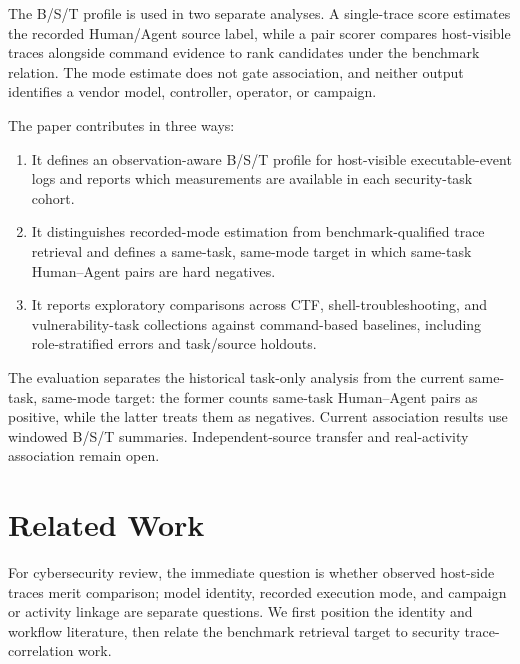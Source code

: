 \documentclass[10pt]{article}
\begin{document}
The B/S/T profile is used in two separate analyses. A single-trace score estimates the recorded Human/Agent source label, while a pair scorer compares host-visible traces alongside command evidence to rank candidates under the benchmark relation. The mode estimate does not gate association, and neither output identifies a vendor model, controller, operator, or campaign.

The paper contributes in three ways:
\begin{enumerate}
\item It defines an observation-aware B/S/T profile for host-visible executable-event logs and reports which measurements are available in each security-task cohort.
\item It distinguishes recorded-mode estimation from benchmark-qualified trace retrieval and defines a same-task, same-mode target in which same-task Human--Agent pairs are hard negatives.
\item It reports exploratory comparisons across CTF, shell-troubleshooting, and vulnerability-task collections against command-based baselines, including role-stratified errors and task/source holdouts.
\end{enumerate}
The evaluation separates the historical task-only analysis from the current same-task, same-mode target: the former counts same-task Human--Agent pairs as positive, while the latter treats them as negatives. Current association results use windowed B/S/T summaries. Independent-source transfer and real-activity association remain open.

\FloatBarrier

\section{Related Work}
\label{sec:related-work}
For cybersecurity review, the immediate question is whether observed host-side traces merit comparison; model identity, recorded execution mode, and campaign or activity linkage are separate questions. We first position the identity and workflow literature, then relate the benchmark retrieval target to security trace-correlation work.
\end{document}
